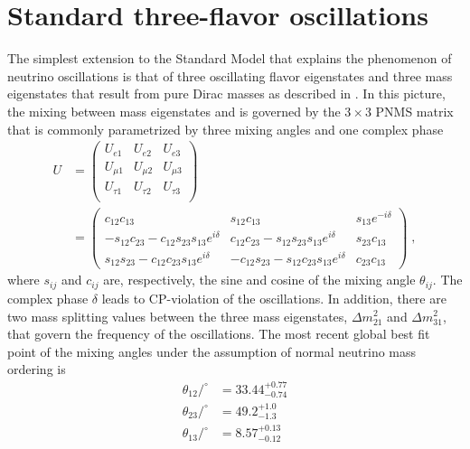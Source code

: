 \section{Standard three-flavor oscillations}
The simplest extension to the Standard Model that explains the phenomenon of neutrino oscillations is that of three oscillating flavor eigenstates and three mass eigenstates that result from pure Dirac masses as described in . In this picture, the mixing between mass eigenstates and is governed by the $3\times3$ PNMS matrix that is commonly parametrized by three mixing angles and one complex phase
\begin{equation}
\begin{aligned}
    U &=
    \begin{pmatrix}
    U_{e1}    & U_{e2}    & U_{e3}    \\
    U_{\mu1}  & U_{\mu2}  & U_{\mu3}  \\
    U_{\tau1} & U_{\tau2} & U_{\tau3} \\
    \end{pmatrix} \\
    &=
    \begin{pmatrix}
        c_{12} c_{13} & s_{12} c_{13} & s_{13}e^{-i\delta}       \\
        -s_{12}c_{23} - c_{12}s_{23}s_{13}e^{i\delta} & c_{12}c_{23}-s_{12}s_{23}s_{13}e^{i\delta} & s_{23}c_{13} \\
        s_{12}s_{23}-c_{12}c_{23}s_{13}e^{i\delta} & -c_{12}s_{23}-s_{12}c_{23}s_{13}e^{i\delta} & c_{23}c_{13}
    \end{pmatrix}\;,
\end{aligned}\label{eq:pnms-parametrization}
\end{equation}
where $s_{ij}$ and $c_{ij}$ are, respectively, the sine and cosine of the mixing angle $\theta_{ij}$. The complex phase $\delta$ leads to CP-violation of the oscillations. In addition, there are two mass splitting values between the three mass eigenstates, $\Delta m^2_{21}$ and $\Delta m^2_{31}$, that govern the frequency of the oscillations.
The most recent global best fit point\cite{Esteban:2020cvm} of the mixing angles under the assumption of normal neutrino mass ordering is
\begin{equation}
    \begin{aligned}
        \theta_{12}/^\circ &= 33.44^{+0.77}_{-0.74} \\
        \theta_{23}/^\circ &= 49.2^{+1.0}_{-1.3} \\
        \theta_{13}/^\circ &= 8.57^{+0.13}_{-0.12}\\
    \end{aligned}
\end{equation}
